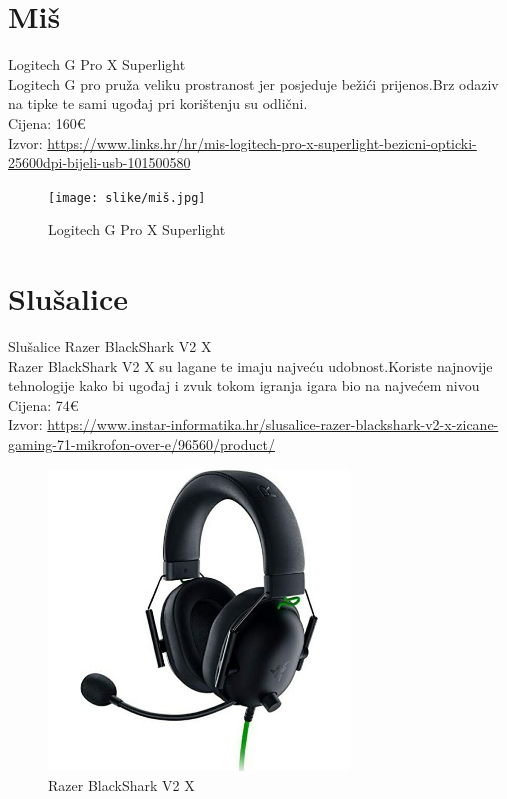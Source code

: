 \documentclass{report}
\begin{document}
\chapter{Miš}
Logitech G Pro X Superlight 
\\Logitech G pro pruža veliku prostranost jer posjeduje bežići prijenos.Brz odaziv na tipke te sami ugođaj pri korištenju su odlični.
\\Cijena: 160€
\\Izvor:  \url{https://www.links.hr/hr/mis-logitech-pro-x-superlight-bezicni-opticki-25600dpi-bijeli-usb-101500580}
\begin{figure}[h]
\texttt{[image: slike/miš.jpg]}
\caption{Logitech G Pro X Superlight}
\end{figure}

\chapter{Slušalice}
Slušalice Razer BlackShark V2 X
\\Razer BlackShark V2 X su lagane te imaju najveću udobnost.Koriste najnovije tehnologije kako bi ugođaj i zvuk tokom igranja igara bio na najvećem nivou
\\Cijena: 74€
\\Izvor:  \url{https://www.instar-informatika.hr/slusalice-razer-blackshark-v2-x-zicane-gaming-71-mikrofon-over-e/96560/product/}
\begin{figure}[h]
\includegraphics[width=8cm]{slike/slusalice.jpg}
\caption{Razer BlackShark V2 X}
\end{figure}
\end{document}
